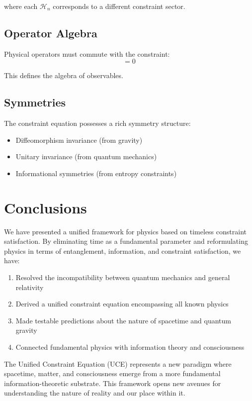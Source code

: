 \documentclass[12pt,a4paper]{article}
\begin{document}
where each $\mathcal{H}_n$ corresponds to a different constraint sector.

\subsection{Operator Algebra}

Physical operators must commute with the constraint:
\begin{equation}
[\hat{O}_{phys}, \mathcal{H}_{total}] = 0
\end{equation}

This defines the algebra of observables.

\subsection{Symmetries}

The constraint equation possesses a rich symmetry structure:
\begin{itemize}
\item Diffeomorphism invariance (from gravity)
\item Unitary invariance (from quantum mechanics)
\item Informational symmetries (from entropy constraints)
\end{itemize}

\section{Conclusions}

We have presented a unified framework for physics based on timeless constraint satisfaction. By eliminating time as a fundamental parameter and reformulating physics in terms of entanglement, information, and constraint satisfaction, we have:

\begin{enumerate}
\item Resolved the incompatibility between quantum mechanics and general relativity
\item Derived a unified constraint equation encompassing all known physics
\item Made testable predictions about the nature of spacetime and quantum gravity
\item Connected fundamental physics with information theory and consciousness
\end{enumerate}

The Unified Constraint Equation (UCE) represents a new paradigm where spacetime, matter, and consciousness emerge from a more fundamental information-theoretic substrate. This framework opens new avenues for understanding the nature of reality and our place within it.
\end{document}
